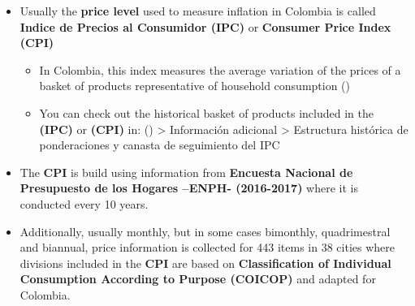 \documentclass[
  ignorenonframetext,
]{beamer}
\begin{document}
\begin{frame}{}
\label{section-6}
\begin{itemize}
\item
  Usually the \textbf{price level} used to measure inflation in Colombia
  is called \textbf{Indice de Precios al Consumidor (IPC)} or
  \textbf{Consumer Price Index (CPI)}

  \begin{itemize}
  \item
    In Colombia, this index measures the average variation of the prices
    of a basket of products representative of household consumption
    ()
  \item
    You can check out the historical basket of products included in the
    \textbf{(IPC)} or \textbf{(CPI)} in:
    ()
    \textgreater{} Información adicional \textgreater{} Estructura
    histórica de ponderaciones y canasta de seguimiento del IPC
  \end{itemize}
\end{itemize}
\end{frame}

\begin{frame}{}
\label{section-7}
\begin{itemize}
\item
  The \textbf{CPI} is build using information from \textbf{Encuesta
  Nacional de Presupuesto de los Hogares --ENPH- (2016-2017)} where it
  is conducted every 10 years.
\item
  Additionally, usually monthly, but in some cases bimonthly,
  quadrimestral and biannual, price information is collected for 443
  items in 38 cities where divisions included in the \textbf{CPI} are
  based on \textbf{Classification of Individual Consumption According to
  Purpose (COICOP)} and adapted for Colombia.
\end{itemize}
\end{frame}
\end{document}
